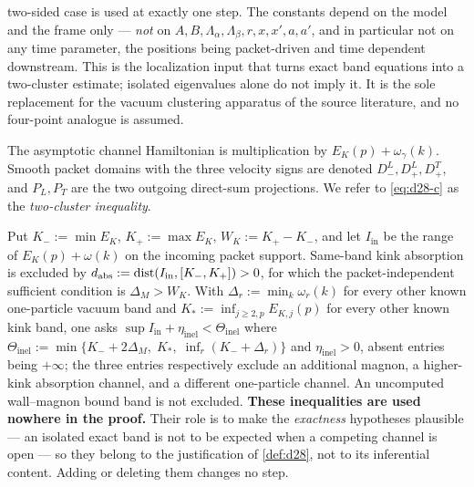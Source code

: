 \begin{definition}
\begin{enumerate}
two-sided case is used at exactly one step. The constants depend on the model
and the frame only --- \emph{not} on $A,B,\Lambda_\alpha,\Lambda_\beta,r,x,x',
a,a'$, and in particular not on any time parameter, the positions being
packet-driven and time dependent downstream. This is the localization input
that turns exact band equations into a two-cluster estimate; isolated
eigenvalues alone do not imply it. It is the sole replacement for the vacuum
clustering apparatus of the source literature, and no four-point analogue is
assumed.
\end{enumerate}
The asymptotic channel Hamiltonian is multiplication by
$E_K(p)+\omega_\gamma(k)$. Smooth packet domains with the three velocity signs
are denoted $D_-^L,D_+^L,D_+^T$, and $P_L,P_T$ are the two outgoing direct-sum
projections. We refer to \eqref{eq:d28-c} as the \emph{two-cluster
inequality}.
\end{definition}

\begin{remark}
\label{rem:d28-r}
Put $K_-:=\min E_K$, $K_+:=\max E_K$, $W_K:=K_+-K_-$, and let $I_{\mathrm{in}}$
be the range of $E_K(p)+\omega(k)$ on the incoming packet support. Same-band
kink absorption is excluded by
$d_{\mathrm{abs}}:=\operatorname{dist}(I_{\mathrm{in}},[K_-,K_+])>0$, for which the
packet-independent sufficient condition is $\Delta_M>W_K$. With
$\Delta_r:=\min_k\omega_r(k)$ for every other known one-particle vacuum band
and $K_*:=\inf_{j\ge2,p}E_{K,j}(p)$ for every other known kink band, one asks
$\sup I_{\mathrm{in}}+\eta_{\mathrm{inel}}<\Theta_{\mathrm{inel}}$ where
$\Theta_{\mathrm{inel}}:=\min\{K_-+2\Delta_M,\;K_*,\;\inf_r(K_-+\Delta_r)\}$
and $\eta_{\mathrm{inel}}>0$, absent entries being $+\infty$; the three entries
respectively exclude an additional magnon, a higher-kink absorption channel,
and a different one-particle channel. An uncomputed wall--magnon bound band is
not excluded. \textbf{These inequalities are used nowhere in the proof.} Their
role is to make the \emph{exactness} hypotheses plausible --- an isolated exact
band is not to be expected when a competing channel is open --- so they belong
to the justification of \cref{def:d28}, not to its inferential content. Adding
or deleting them changes no step.
\end{remark}

